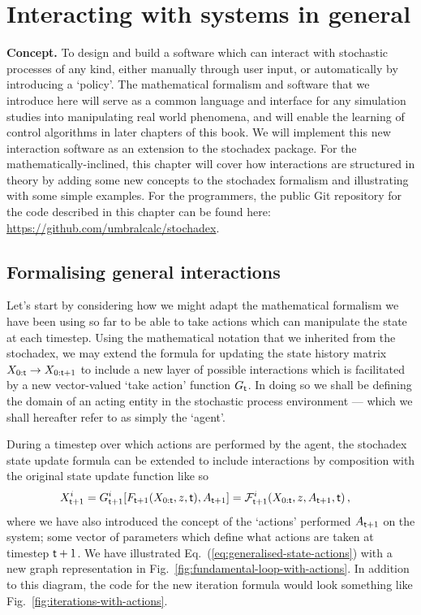 \chapter{\sffamily Interacting with systems in general}

{\bfseries\sffamily Concept.} To design and build a software which can interact with stochastic processes of any kind, either manually through user input, or automatically by introducing a `policy'. The mathematical formalism and software that we introduce here will serve as a common language and interface for any simulation studies into manipulating real world phenomena, and will enable the learning of control algorithms in later chapters of this book. We will implement this new interaction software as an extension to the stochadex package. For the mathematically-inclined, this chapter will cover how interactions are structured in theory by adding some new concepts to the stochadex formalism and illustrating with some simple examples. For the programmers, the public Git repository for the code described in this chapter can be found here: \href{https://github.com/umbralcalc/stochadex}{https://github.com/umbralcalc/stochadex}.

\section{\sffamily Formalising general interactions}

Let's start by considering how we might adapt the mathematical formalism we have been using so far to be able to take actions which can manipulate the state at each timestep. Using the mathematical notation that we inherited from the stochadex, we may extend the formula for updating the state history matrix $X_{0:{\sf t}}\rightarrow X_{0:{\sf t}+1}$ to include a new layer of possible interactions which is facilitated by a new vector-valued `take action' function $G_{{\sf t}}$. In doing so we shall be defining the domain of an acting entity in the stochastic process environment --- which we shall hereafter refer to as simply the `agent'.

During a timestep over which actions are performed by the agent, the stochadex state update formula can be extended to include interactions by composition with the original state update function like so
\begin{align}
X_{{\sf t}+1}^i &= G^i_{{\sf t}+1}[F_{{\sf t}+1}(X_{0:{\sf t}}, z, {\sf t}), A_{{\sf t}+1}] = {\cal F}^i_{{\sf t}+1}(X_{0:{\sf t}}, z, A_{{\sf t}+1}, {\sf t}) \label{eq:generalised-state-actions} \,,
\end{align}
where we have also introduced the concept of the `actions' performed $A_{{\sf t}+1}$ on the system; some vector of parameters which define what actions are taken at timestep ${\sf t}+1$. We have illustrated Eq.~(\ref{eq:generalised-state-actions}) with a new graph representation in Fig.~\ref{fig:fundamental-loop-with-actions}. In addition to this diagram, the code for the new iteration formula would look something like Fig.~\ref{fig:iterations-with-actions}.

